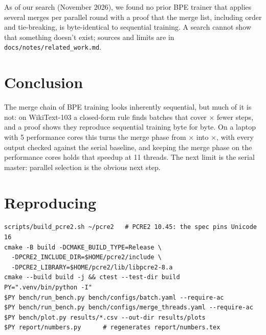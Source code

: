 \documentclass[11pt,a4paper]{article}
\newcommand{\code}[1]{\texttt{#1}}
\newcommand{\x}{$\times$}
\begin{document}
As of our search (November 2026), we found no prior BPE trainer that applies several merges per parallel round with a proof
that the merge list, including order and tie-breaking, is byte-identical to sequential training. A search cannot show that
something doesn't exist; sources and limits are in \code{docs/notes/related\_work.md}.

\section{Conclusion}

The merge chain of BPE training looks inherently sequential, but much of it is not: on WikiText-103 a closed-form rule
finds batches that cover \wtSpan\x{} fewer steps, and a proof shows they reproduce sequential training byte for byte. On a
laptop with 5 performance cores this turns the merge phase from \wtParFive\x{} into \wtBatchFive\x{}, with every output
checked against the serial baseline, and keeping the merge phase on the performance cores holds that speedup at 11
threads. The next limit is the serial master: parallel selection is the obvious next step.

\appendix
\section{Reproducing}
\begin{verbatim}
scripts/build_pcre2.sh ~/pcre2   # PCRE2 10.45: the spec pins Unicode 16
cmake -B build -DCMAKE_BUILD_TYPE=Release \
  -DPCRE2_INCLUDE_DIR=$HOME/pcre2/include \
  -DPCRE2_LIBRARY=$HOME/pcre2/lib/libpcre2-8.a
cmake --build build -j && ctest --test-dir build
PY=".venv/bin/python -I"
$PY bench/run_bench.py bench/configs/batch.yaml --require-ac
$PY bench/run_bench.py bench/configs/merge_threads.yaml --require-ac
$PY bench/plot.py results/*.csv --out-dir results/plots
$PY report/numbers.py      # regenerates report/numbers.tex
\end{verbatim}
\end{document}
